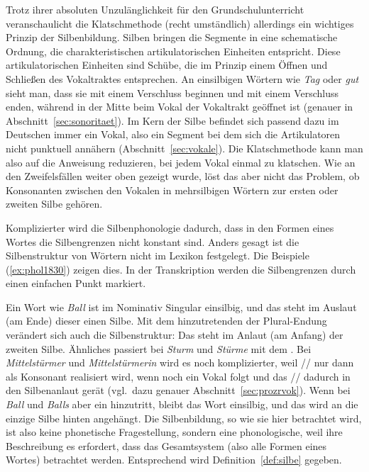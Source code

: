 Trotz ihrer absoluten Unzulänglichkeit für den Grundschulunterricht veranschaulicht die Klatschmethode (recht umständlich) allerdings ein wichtiges Prinzip der Silbenbildung.
Silben bringen die Segmente in eine schematische Ordnung, die charakteristischen artikulatorischen Einheiten entspricht.
Diese artikulatorischen Einheiten sind Schübe, die im Prinzip einem Öffnen und Schließen des Vokaltraktes entsprechen.
An einsilbigen Wörtern wie \textit{Tag} \textipa{[ta:k]} oder \textit{gut} \textipa{[gU:t]} sieht man, dass sie mit einem Verschluss beginnen und mit einem Verschluss enden, während in der Mitte beim Vokal der Vokaltrakt geöffnet ist (genauer in Abschnitt~\ref{sec:sonoritaet}).
Im Kern der Silbe befindet sich passend dazu im Deutschen immer ein Vokal, also ein Segment bei dem sich die Artikulatoren nicht punktuell annähern (Abschnitt~\ref{sec:vokale}).
Die Klatschmethode kann man also auf die Anweisung reduzieren, bei jedem Vokal einmal zu klatschen.
Wie an den Zweifelsfällen weiter oben gezeigt wurde, löst das aber nicht das Problem, ob Konsonanten zwischen den Vokalen in mehrsilbigen Wörtern zur ersten oder zweiten Silbe gehören.

Komplizierter wird die Silbenphonologie dadurch, dass in den Formen eines Wortes die Silbengrenzen nicht konstant sind.
Anders gesagt ist die Silbenstruktur von Wörtern nicht im Lexikon festgelegt.
Die Beispiele (\ref{ex:phol1830}) zeigen dies.
In der Transkription werden die Silbengrenzen durch einen einfachen Punkt markiert.

\begin{exe}
  \ex\label{ex:phol1830}
  \begin{xlist}
  \end{xlist}
\end{exe}

Ein Wort wie \textit{Ball} ist im Nominativ Singular einsilbig, und das \textipa{[l]} steht im Auslaut (am Ende) dieser einen Silbe.
Mit dem hinzutretenden \textipa{[@]} der Plural-Endung verändert sich auch die Silbenstruktur:
Das \textipa{[l]} steht im Anlaut (am Anfang) der zweiten Silbe.
Ähnliches passiert bei \textit{Sturm} und \textit{Stürme} mit dem \textipa{[m]}.
Bei \textit{Mittelstürmer} \textipa{[mI.t@l.St\t{Y@}.m5]} und \textit{Mittelstürmerin} \textipa{[mI.t@l.St\t{Y@}.m@.KIn]} wird es noch komplizierter, weil // nur dann als Konsonant \textipa{[K]} realisiert wird, wenn noch ein Vokal folgt und das // dadurch in den Silbenanlaut gerät (vgl.\ dazu genauer Abschnitt~\ref{sec:prozrvok}).
Wenn bei \textit{Ball} und \textit{Balls} aber ein \textipa{[s]} hinzutritt, bleibt das Wort einsilbig, und das \textipa{[s]} wird an die einzige Silbe hinten angehängt.
Die Silbenbildung, so wie sie hier betrachtet wird, ist also keine phonetische Fragestellung, sondern eine phonologische, weil ihre Beschreibung es erfordert, dass das Gesamtsystem (also \zB alle Formen eines Wortes) betrachtet werden.
Entsprechend wird Definition~\ref{def:silbe} gegeben.

